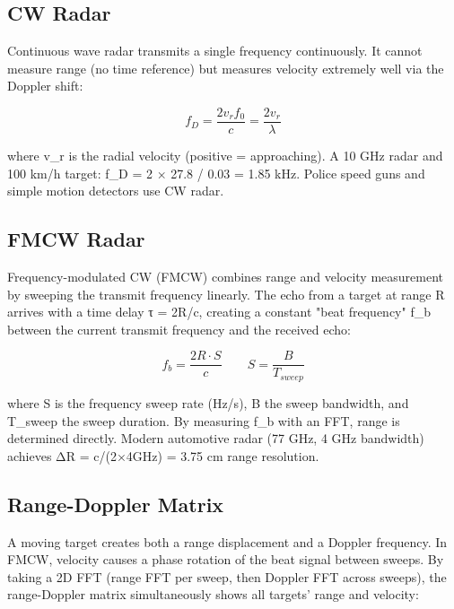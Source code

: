       

\subsection{CW Radar}

      

Continuous wave radar transmits a single frequency continuously. It cannot measure range (no time reference) but measures velocity extremely well via the Doppler shift:

      
\[f_D = \dfrac{2v_r f_0}{c} = \dfrac{2v_r}{\lambda}\]

      

where v\_r is the radial velocity (positive = approaching). A 10 GHz radar and 100 km/h target: f\_D = 2 × 27.8 / 0.03 = 1.85 kHz. Police speed guns and simple motion detectors use CW radar.

      

\subsection{FMCW Radar}

      

Frequency-modulated CW (FMCW) combines range and velocity measurement by sweeping the transmit frequency linearly. The echo from a target at range R arrives with a time delay τ = 2R/c, creating a constant "beat frequency" f\_b between the current transmit frequency and the received echo:


      
\[f_b = \dfrac{2R \cdot S}{c} \qquad S = \dfrac{B}{T_{sweep}}\]

      

where S is the frequency sweep rate (Hz/s), B the sweep bandwidth, and T\_sweep the sweep duration. By measuring f\_b with an FFT, range is determined directly. Modern automotive radar (77 GHz, 4 GHz bandwidth) achieves ΔR = c/(2×4GHz) = 3.75 cm range resolution.

      

\subsection{Range-Doppler Matrix}

      

A moving target creates both a range displacement and a Doppler frequency. In FMCW, velocity causes a phase rotation of the beat signal between sweeps. By taking a 2D FFT (range FFT per sweep, then Doppler FFT across sweeps), the range-Doppler matrix simultaneously shows all targets' range and velocity:

